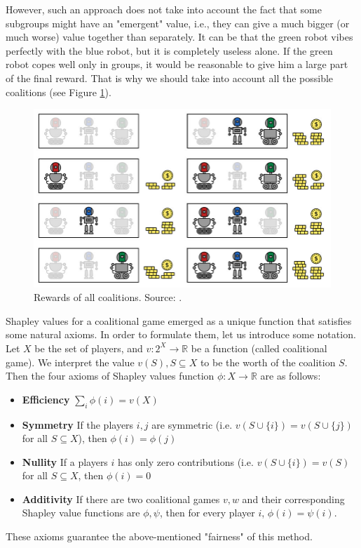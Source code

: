 \documentclass[magisterska,en]{pracamgr}
\begin{document}
However, such an approach does not take into account the fact that some subgroups might have an "emergent" value, i.e., they can give a much bigger (or much worse) value together than separately. It can be that the green robot vibes perfectly with the blue robot, but it is completely useless alone. If the green robot copes well only in groups, it would be reasonable to give him a large part of the final reward. That is why we should take into account all the possible coalitions (see Figure \ref{rewards_all}).

\begin{figure}[H]
\centering
\includegraphics[scale=0.3]{./images/Shap_all_coal.png}
\caption{Rewards of all coalitions. Source: \cite{DBLP:conf/ijcai/RozemberczkiWBY22}.}
\label{rewards_all}
\end{figure}

Shapley values for a coalitional game emerged as a unique function that satisfies some natural axioms. In order to formulate them, let us introduce some notation.  Let $X$ be the set of players, and $v: 2^X \rightarrow \mathbb{R}$ be a function (called coalitional game). We interpret the value $v(S), S \subseteq X$ to be the worth of the coalition $S$. Then the four axioms of Shapley values function $\phi:X  \rightarrow \mathbb{R}$ are as follows:
\begin{itemize}
\item \textbf{Efficiency}  $\sum_i  \phi(i) = v(X)$
\item \textbf{Symmetry} If the players $i, j$ are symmetric (i.e. $v(S\cup \{i\}) = v(S \cup \{j\})$ for all $S \subseteq X$), then $\phi(i) = \phi(j)$
\item \textbf{Nullity} If a players $i$ has only zero contributions (i.e. $v(S\cup \{i\}) = v(S)$ for all $S \subseteq X$, then $\phi(i) = 0$
\item \textbf{Additivity} If there are two coalitional games $v, w$ and their corresponding Shapley value functions are $\phi, \psi$, then for every player $i$, $\phi(i) = \psi(i)$.
\end{itemize}
These axioms guarantee the above-mentioned "fairness" of this method.
\end{document}
